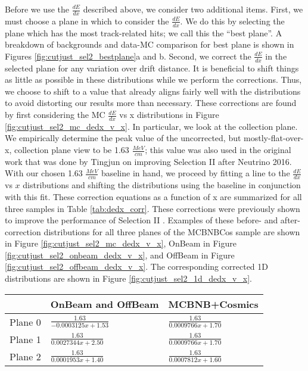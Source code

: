 \par Before we use the $\frac{dE}{dx}$ described above, we consider two additional items. First, we must choose a plane in which to consider the $\frac{dE}{dx}$.  We do this by selecting the plane which has the most track-related hits; we call this the ``best plane''. A breakdown of backgrounds and data-MC comparison for best plane is shown in Figures \ref{fig:cutjust_sel2_bestplane}a and b. Second, we correct the $\frac{dE}{dx}$ in the selected plane for any variation over drift distance. It is beneficial to shift things as little as possible in these distributions while we perform the corrections. Thus, we choose to shift to a value that already aligns fairly well with the distributions to avoid distorting our results more than necessary.  These corrections are found by first considering the MC $\frac{dE}{dx}$ vs x distributions in Figure \ref{fig:cutjust_sel2_mc_dedx_v_x}. In particular, we look at the collection plane. We empirically determine the peak value of the uncorrected, but mostly-flat-over-x, collection plane view to be 1.63 $\frac{MeV}{cm}$; this value was also used in the original work that was done by Tingjun on improving Selection II after Neutrino 2016. With our chosen 1.63 $\frac{MeV}{cm}$ baseline in hand, we proceed by fitting a line to the $\frac{dE}{dx}$ vs $x$ distributions and shifting the distributions using the baseline in conjunction with this fit. These correction equations as a function of x are summarized for all three samples in Table \ref{tab:dedx_corr}. These corrections were previously shown to improve the performance of Selection II \cite{bib:6172}. Examples of these before- and after-correction distributions for all three planes of the MCBNBCos sample are shown in Figure \ref{fig:cutjust_sel2_mc_dedx_v_x}, OnBeam in Figure \ref{fig:cutjust_sel2_onbeam_dedx_v_x}, and OffBeam in Figure \ref{fig:cutjust_sel2_offbeam_dedx_v_x}. The corresponding corrected 1D distributions are shown in Figure \ref{fig:cutjust_sel2_1d_dedx_v_x}.  

\begin{table} 
 \centering
 \begin{tabular}{| l | l | l |}
  \hline
  & OnBeam and OffBeam & MCBNB+Cosmics \\ [0.1ex] \hline
Plane 0 & $\frac{1.63}{-0.0003125x + 1.53}$ & $\frac{1.63}{0.0009766x + 1.70}$ \\ \hline
Plane 1 & $\frac{1.63}{0.0027344x + 2.50}$ & $\frac{1.63}{0.0009766x + 1.70}$ \\ \hline 
Plane 2 & $\frac{1.63}{0.0001953x + 1.40}$ & $\frac{1.63}{0.0007812x + 1.60}$ \\  \hline
\end{tabular}
\end{table}


